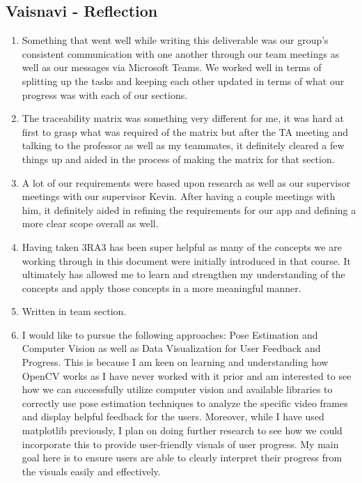 \documentclass[12pt]{article}
\begin{document}
\subsection*{Vaisnavi - Reflection}
\begin{enumerate}
  \item Something that went well while writing this deliverable was our group's consistent communication with one another through our team meetings as well as our messages via Microsoft Teams.  We worked well in terms of splitting up the tasks and keeping each other updated in terms of what our progress was with each of our sections.
  \item The traceability matrix was something very different for me, it was hard at first to grasp what was required of the matrix but after the TA meeting and talking to the professor as well as my teammates, it definitely cleared a few things up and aided in the process of making the matrix for that section. 
  \item A lot of our requirements were based upon research as well as our supervisor meetings with our supervisor Kevin. After having a couple meetings with him, it definitely aided in refining the requirements for our app and defining a more clear scope overall as well. 
  \item Having taken 3RA3 has been super helpful as many of the concepts we are working through in this document were initially introduced in that course. It ultimately has allowed me to learn and strengthen my understanding of the concepts and apply those concepts in a more meaningful manner.
  \item Written in team section.
  \item I would like to pursue the following approaches: Pose Estimation and Computer Vision as well as Data Visualization for User Feedback and Progress. This is because I am keen on learning and understanding how OpenCV works as I have never worked with it prior and am interested to see how we can successfully utilize computer vision and available libraries to correctly use pose estimation techniques to analyze the specific video frames and display helpful feedback for the users. Moreover, while I have used matplotlib previously, I plan on doing further research to see how we could incorporate this to provide user-friendly visuals of user progress. My main goal here is to ensure users are able to clearly interpret their progress from the visuals easily and effectively. \\
\end{enumerate}
\end{document}
